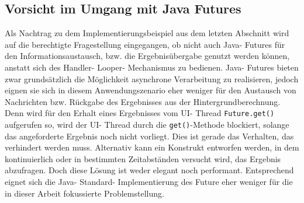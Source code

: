 \documentclass[12pt,oneside,a4paper,bibtotoc,liststotoc]{scrreprt}
\begin{document}
\subsection{Vorsicht im Umgang mit Java Futures}
Als Nachtrag zu dem Implementierungsbeispiel aus dem letzten Abschnitt wird auf die berechtigte Fragestellung eingegangen, ob nicht auch Java- Futures für den Informationsaustausch, bzw. die Ergebnisübergabe genutzt werden können, anstatt sich des Handler- Looper- Mechanismus zu bedienen. Java- Futures bieten zwar grundsätzlich die Möglichkeit asynchrone Verarbeitung zu realisieren, jedoch eignen sie sich in diesem Anwendungszenario eher weniger für den Austausch von Nachrichten bzw. Rückgabe des Ergebnisses aus der Hintergrundberechnung. Denn wird für den Erhalt eines Ergebnisses vom UI- Thread \texttt{Future.get()} aufgerufen so, wird der UI- Thread durch die \texttt{get()}-Methode blockiert, solange das angeforderte Ergebnis noch nicht vorliegt. Dies ist gerade das Verhalten, das verhindert werden muss. Alternativ kann ein Konstrukt entworfen werden, in dem kontinuierlich oder in bestimmten Zeitabständen versucht wird, das Ergebnis abzufragen. Doch diese Lösung ist weder elegant noch performant. Entsprechend eignet sich die Java- Standard- Implementierung des Future eher weniger für die in dieser Arbeit fokussierte Problemstellung. 
\end{document}
